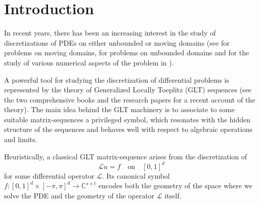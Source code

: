 \documentclass{amsart}
\begin{document}
\section{Introduction}





In recent years, there has been an increasing interest in the study of discretizations of PDEs on either unbounded or moving domains (see \cite{CCKR18,Coco20} for problems on moving domains, \cite{CS07,CCNR14} for problems on unbounded domains and \cite{ABKST26,dT14,dTEJ18,dTEJ19} for the study of various numerical aspects of the problem in \cite{CS07}).

A powerful tool for studying the discretization of differential problems is represented by the theory of Generalized Locally Toeplitz (GLT) sequences (see the two comprehensive books \cite{glt-book-1,glt-book-2} and the research papers \cite{GLT-block1D,GLT-blockdD} for a recent account of the theory). The main idea behind the GLT machinery is to associate to some suitable matrix-sequences a privileged symbol, which resonates with the hidden structure of the sequences and behaves well with respect to algebraic operations and limits.

Heuristically, a classical GLT matrix-sequence arises from the discretization of
$$\mathcal{L}u=f \quad \text{on} \quad [0,1]^d$$
for some differential operator $\mathcal{L}$. Its canonical symbol $f:[0,1]^d\times [-\pi,\pi]^d \to \mathbb{C}^{s \times t}$ encodes both the geometry of the space where we solve the PDE and the geometry of the operator $\mathcal{L}$ itself.
\end{document}
